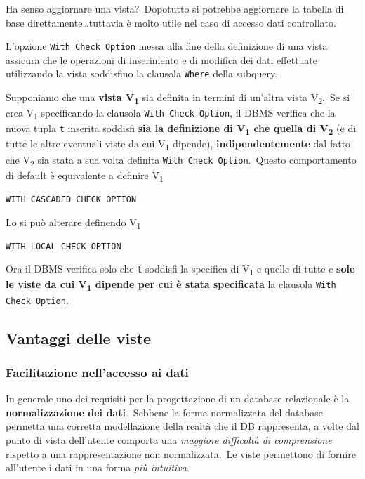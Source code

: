 Ha senso aggiornare una vista?\
Dopotutto si potrebbe aggiornare la tabella di base direttamente\dots tuttavia è molto utile nel caso di accesso dati controllato.

L'opzione \texttt{With Check Option} messa alla fine della definizione di una vista assicura che le operazioni di inserimento e di modifica dei dati effettuate utilizzando la vista soddisfino la clausola \texttt{Where} della subquery.\

Supponiamo che una \textbf{vista V\textsubscript{1}} sia definita in termini di un'altra vista V\textsubscript{2}.\
Se si crea V\textsubscript{1} specificando la clausola \texttt{With Check Option}, il DBMS verifica che la nuova tupla \texttt{t} inserita soddisfi \textbf{sia la definizione di V\textsubscript{1} che quella di V\textsubscript{2}} (e di tutte le altre eventuali viste da cui V\textsubscript{1} dipende), \textbf{indipendentemente} dal fatto che V\textsubscript{2} sia stata a sua volta definita \texttt{With Check Option}.\
Questo comportamento di default è equivalente a definire V\textsubscript{1}
\begin{center}
	\texttt{WITH CASCADED CHECK OPTION}
\end{center}

\noindent Lo si può alterare definendo V\textsubscript{1}
\begin{center}
	\texttt{WITH LOCAL CHECK OPTION}
\end{center}

\noindent Ora il DBMS verifica solo che \texttt{t} soddisfi la specifica di V\textsubscript{1} e quelle di tutte e \textbf{sole le viste da cui V\textsubscript{1} dipende per cui è stata specificata} la clausola \texttt{With Check Option}.

\subsection{Vantaggi delle viste}

\subsubsection{Facilitazione nell'accesso ai dati}

In generale uno dei requisiti per la progettazione di un database relazionale è la \textbf{normalizzazione dei dati}.\
Sebbene la forma normalizzata del database permetta una corretta modellazione della realtà che il DB rappresenta, a volte dal punto di vista dell'utente comporta una \textit{maggiore difficoltà di comprensione} rispetto a una rappresentazione non normalizzata.\
Le viste permettono di fornire all'utente i dati in una forma \textit{più intuitiva}.


